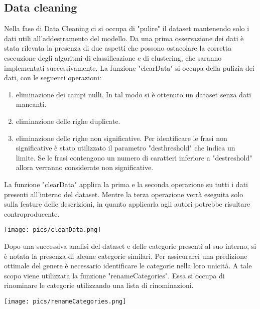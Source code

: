 \documentclass[12pt,oneside]{article}
\begin{document}
    \begin{enumerate}
    \subsection{Data cleaning}\label{tre}
    \begin{justify}
    Nella fase di Data Cleaning ci si occupa di "pulire" il dataset mantenendo solo i dati utili all'addestramento del modello. Da una prima osservazione dei dati è stata rilevata la presenza di due aspetti che possono ostacolare la corretta esecuzione degli algoritmi di classificazione e di clustering, che saranno implementati successivamente. La funzione "clearData" si occupa della pulizia dei dati, con le seguenti operazioni: 
    \begin{enumerate}[label=\arabic*)]
        \item eliminazione dei campi nulli. In tal modo si è ottenuto un dataset senza dati mancanti.
        \item eliminazione delle righe duplicate.
        \item eliminazione delle righe non significative. Per identificare le frasi non significative è stato utilizzato il parametro "des\textunderscore{}threshold" che indica un limite. Se le frasi contengono un numero di caratteri inferiore a "des\textunderscore{}treshold" allora verranno considerate non significative.
    \end{enumerate}
    La funzione "clearData" applica la prima e la seconda operazione su tutti i dati presenti all'interno del dataset. Mentre la terza operazione verrà eseguita solo sulla feature delle descrizioni, in quanto applicarla agli autori potrebbe risultare controproducente. 
    \end{justify}
    \texttt{[image: pics/cleanData.png]}
    
    \newpage
    \begin{justify}
    Dopo una successiva analisi del dataset e delle categorie presenti al suo interno, si è notata la presenza di alcune categorie similari. Per assicurarci una predizione ottimale del genere è necessario identificare le categorie nella loro unicità. A tale scopo viene utilizzata la funzione "renameCategories". Essa si occupa di rinominare le categorie utilizzando una lista di rinominazioni.
    \end{justify}

    \texttt{[image: pics/renameCategories.png]}


\end{enumerate}
\end{document}

